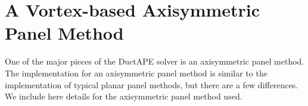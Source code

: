 \chapter{A Vortex-based Axisymmetric Panel Method}
\label{ch:panel_method}

One of the major pieces of the DuctAPE solver is an axisymmetric panel method.
The implementation for an axisymmetric panel method is similar to the implementation of typical planar panel methods, but there are a few differences.
We include here details for the axisymmetric panel method used.


%

%

%

%


\printbibliography[keyword={panel},heading=subbibintoc,title=Chapter \thechapter~References]
